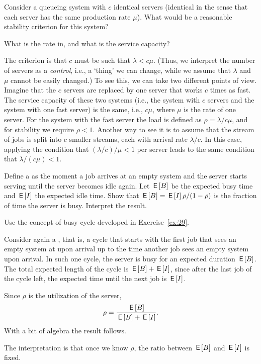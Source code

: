 \begin{exercise}{\faFlask}
  Consider a queueing system with $c$ identical servers (identical in
  the sense that each server has the same production rate $\mu$). What would be a reasonable stability criterion for this system? 
  \begin{hint}
What is the rate in, and what is the service capacity?
  \end{hint}
  \begin{solution}
    The criterion is that $c$ must be such that $\lambda <
    c\mu$.
    (Thus, we interpret the number of servers as a \emph{control},
    i.e., a `thing' we can change, while we assume that $\lambda$ and
    $\mu$ cannot be easily changed.) To see this, we can take two
  different points of view.  Imagine that the $c$ servers are replaced
  by one server that works $c$ times as fast. The service capacity of
  these two systems (i.e., the system with $c$ servers and the system
  with one fast server) is the same, i.e., $c\mu$, where $\mu$ is the
  rate of one server. For the system with the fast server the load is
  defined as $\rho =\lambda/c\mu$, and for stability we require
  $\rho<1$.  Another way to see it is to assume that the stream of
  jobs is split into $c$ smaller streams, each with arrival rate
  $\lambda/c$.  In this case, applying the condition that
  $(\lambda/c )/\mu<1$ per server leads to the same condition that
  $\lambda/(c\mu) < 1$.
  \end{solution}
\end{exercise}



\begin{exercise}{\faPhoto}\label{ex:11}
  Define a  as the moment a job arrives at an empty system and the server starts serving until the server becomes idle again.
  Let $\,\mathsf{E}\left[B\right]$ be the expected busy time and $\,\mathsf{E}\left[I\right]$  the expected idle time. Show that $\,\mathsf{E}\left[B\right] = \,\mathsf{E}\left[I\right] \rho/(1-\rho) $ is the fraction of time the server is busy. Interpret the result.
  \begin{hint}
    Use the concept of busy cycle developed in Exercise~\ref{ex:29}. 
  \end{hint}
\begin{solution}
  Consider again a , that is, a cycle that starts with the first
  job that sees an empty system at upon arrival up to the time another
  job sees an empty system upon arrival. In such one cycle, the server
  is busy for an expected duration $\,\mathsf{E}\left[B\right]$. The total expected length
  of the cycle is $\,\mathsf{E}\left[B\right] + \,\mathsf{E}\left[I\right]$, since after the last job of the cycle
  left, the expected time until the next job is $\,\mathsf{E}\left[I\right]$.

  Since $\rho$ is the utilization of the server,
  \begin{equation*}
\rho = \frac{\,\mathsf{E}\left[B\right]}{\,\mathsf{E}\left[B\right] + \,\mathsf{E}\left[I\right]}.
  \end{equation*}
  With a bit of algebra the result follows.

  The interpretation is that once we know $\rho$, the ratio between $\,\mathsf{E}\left[B\right]$ and $\,\mathsf{E}\left[I\right]$ is fixed. 
\end{solution}
\end{exercise}

